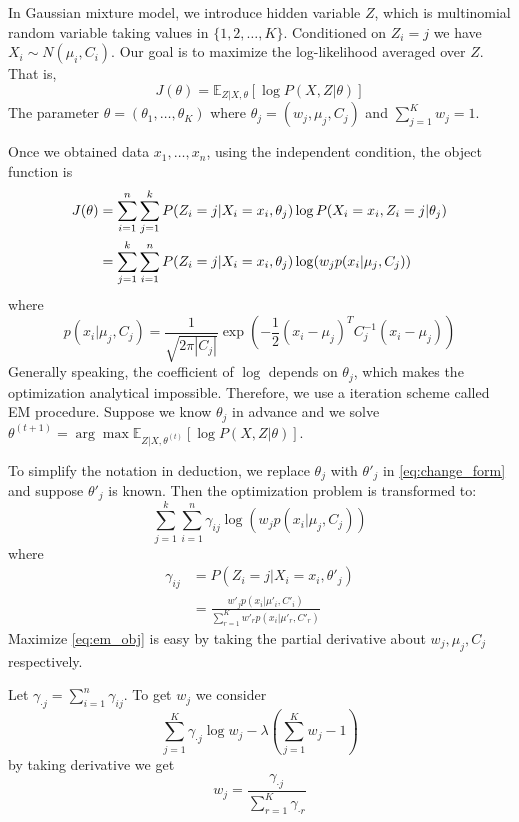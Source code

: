 \documentclass[a4paper, 12pt]{exam}
\begin{document}
	In Gaussian mixture model, we introduce hidden variable $Z$, which
    is multinomial random variable taking values in $\{1, 2, \dots, K\}$.
    Conditioned on $Z_i = j$ we have $X_i \sim N(\mu_i, C_i)$.
	Our goal is to maximize the log-likelihood averaged over $Z$.
	That is,
	$$
	J(\theta) = \mathbb{E}_{Z|X, \theta}[\log P(X, Z | \theta)]
	$$
	The parameter $\theta = (\theta_1, \dots, \theta_K)$ where $\theta_j = (w_j, \mu_j, C_j)$ and $\sum_{j=1}^K w_j =1$.
	
	Once we obtained data $x_1, \dots, x_n$, using the independent condition, the object function is
	\begin{align}
	J(\theta) &= \sum_{i=1}^n \sum_{j=1}^k P(Z_i=j | X_i = x_i, \theta_j) \log P(X_i = x_i, Z_i = j | \theta_j) \notag\\
	 &= \sum_{j=1}^k \sum_{i=1}^nP(Z_i=j | X_i = x_i, \theta_j) \log (w_j p(x_i |\mu_j, C_j)) \label{eq:change_form} 
	\end{align}
	where
	$$
	p(x_i | \mu_j, C_j) = \frac{1}{\sqrt{2\pi|C_j|}} \exp(-\frac{1}{2}(x_i - \mu_j)^TC^{-1}_j(x_i - \mu_j))
	$$
	Generally speaking, the coefficient of $\log$ depends on $\theta_j$, which makes the optimization analytical
	impossible. Therefore, we use a iteration scheme called EM procedure. Suppose we know $\theta_j$ in advance
	and we solve $\theta^{(t+1)}=\arg\max \mathbb{E}_{Z|X, \theta^{(t)}}[\log P(X, Z | \theta)]$.
	
	To simplify the notation in deduction, we replace $\theta_j$ with $\theta'_j$ in \eqref{eq:change_form} and suppose
	$\theta'_j$ is known.
	Then the optimization problem is transformed to:
	\begin{equation}\label{eq:em_obj}
	\sum_{j=1}^k \sum_{i=1}^n \gamma_{ij} \log (w_j p(x_i |\mu_j, C_j))
	\end{equation}
	where 
	\begin{align}
	\gamma_{ij} & = P(Z_i=j | X_i = x_i, \theta'_j) \\
	&=\frac{w'_j p(x_i | \mu'_i, C'_i)}{\sum_{r=1}^K w'_r p(x_i | \mu'_r, C'_r)} \label{eq:estep}
	\end{align}
	Maximize \eqref{eq:em_obj} is easy by taking the partial derivative about $w_j, \mu_j, C_j$ respectively.
	
	Let $\gamma_{\cdot j} = \sum_{i=1}^n \gamma_{ij}$.
	To get $w_j$ we consider
	$$
	\sum_{j=1}^K \gamma_{\cdot j} \log w_j - \lambda(\sum_{j=1}^{K} w_j-1)
	$$
	by taking derivative we get
	\begin{equation}\label{eq:mstep_w}
	w_j = \frac{\gamma_{\cdot j} }{\sum_{r=1}^K \gamma_{\cdot r} }
	\end{equation}
	
\end{document}
